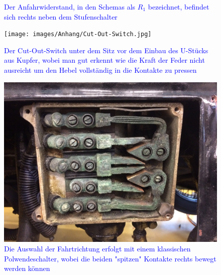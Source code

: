 \begin{landscape}
\begin{figure}[h]
	\caption{\textcolor{blue}{Der Anfahrwiderstand, in den Schemas als $R_1$ bezeichnet, befindet sich rechts neben dem Stufenschalter}}
	\label{fig:Anfahrwiderstand}
\end{figure}
\begin{figure}[h]
	\centering
		\texttt{[image: images/Anhang/Cut-Out-Switch.jpg]}
	\caption{\textcolor{blue}{Der Cut-Out-Switch unter dem Sitz vor dem Einbau des U-Stücks aus Kupfer, wobei man gut erkennt wie die Kraft der Feder nicht ausreicht um den Hebel vollständig in die Kontakte zu pressen}}
	\label{fig:Cut-Out-Switch}
\end{figure}
\begin{figure}[h]
	\centering
		\includegraphics[width=1.30\textwidth]{images/Anhang/Fahrtrichtung.jpg}
	\caption{\textcolor{blue}{Die Auswahl der Fahrtrichtung erfolgt mit einem klassischen Polwendeschalter, wobei die beiden "spitzen" Kontakte rechts bewegt werden können}}
	\label{fig:Fahrtrichtung}
\end{figure}
\begin{figure}[h]
	\centering

\end{figure}
\end{landscape}
